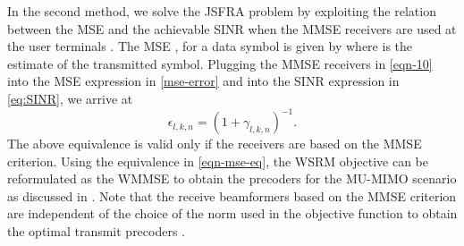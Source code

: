 In the second method, we solve the \ac{JSFRA} problem by exploiting the relation between the \ac{MSE} and the achievable \ac{SINR} when the \ac{MMSE} receivers are used at the user terminals \cite{mse_duality,christensen2008weighted}. The \ac{MSE} , for a data symbol  is given by
\iftoggle{single_column}{
\begin{equation} \label{mse-error}
	\mathbb{E} \big [ ( d_{l,k,n} - \hat{d}_{l,k,n} )^2 \big ] = \left | 1 - \mvec{w}{l,k,n}^\herm \mvec{H}{b_k,k,n} \mvec{m}{l,k,n} \right |^2 + \sum_{\mathclap{(j,i) \neq (l,k)}} \left | \mvec{w}{l,k,n}^\herm \mvec{H}{b_i,k,n} \mvec{m}{j,i,n} \right |^2 + \enoise = \epsilon_{l,k,n}
\end{equation}}{\allowdisplaybreaks
\begin{multline} \label{mse-error}
 \mathbb{E} \big [ ( d_{l,k,n} - \hat{d}_{l,k,n} )^2 \big ] = \left | 1 - \mvec{w}{l,k,n}^\herm \mvec{H}{b_k,k,n} \mvec{m}{l,k,n} \right |^2 \\
 + \sum_{\mathclap{(j,i) \neq (l,k)}} \left | \mvec{w}{l,k,n}^\herm \mvec{H}{b_i,k,n} \mvec{m}{j,i,n} \right |^2 + \enoise = \epsilon_{l,k,n}
\end{multline}}
where  is the estimate of the transmitted symbol. Plugging the \ac{MMSE} receivers in \eqref{eqn-10} into the \ac{MSE} expression in \eqref{mse-error} and into the \ac{SINR} expression in \eqref{eq:SINR}, we arrive at 
\begin{equation} \label{eqn-mse-eq}
\epsilon_{l,k,n} = (1 + \gamma_{l,k,n})^{-1}.
\end{equation}
The above equivalence is valid only if the receivers are based on the \ac{MMSE} criterion. Using the equivalence in \eqref{eqn-mse-eq}, the \ac{WSRM} objective can be reformulated as the \ac{WMMSE} to obtain the precoders for the \acs{MU}-\acs{MIMO} scenario as discussed in \cite{christensen2008weighted,wmmse_shi,hong2012decomposition}. Note that the receive beamformers based on the \ac{MMSE} criterion are independent of the choice of the  norm used in the objective function to obtain the optimal transmit precoders .

